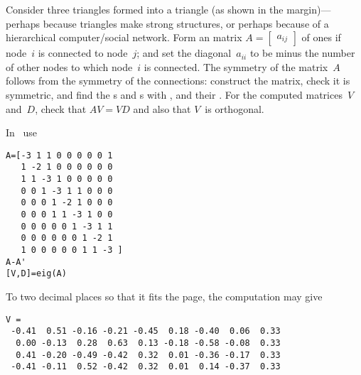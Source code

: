 \begin{example} \label{eg:sier2eig}
Consider three triangles formed into a triangle (as shown in the margin)---perhaps because triangles make strong structures, or perhaps because of a hierarchical computer\slash social network.
%
Form an matrix \(A=\begin{bmatrix} a_{ij} \end{bmatrix}\) of ones if node~\(i\) is connected to node~\(j\); and set the diagonal~\(a_{ii}\) to be minus the number of other nodes to which node~\(i\) is connected.
The symmetry of the matrix~\(A\) follows from the symmetry of the connections: construct the matrix, check it is symmetric, and find the s and s with \script, and their .
For the computed matrices~\(V\) and~\(D\), check that \(AV=VD\) and also that \(V\)~is orthogonal.
\begin{solution} In \script\ use
\setbox\ajrqrbox\hbox{}%
\marginpar{\usebox{\ajrqrbox}}%
\begin{verbatim}
A=[-3 1 1 0 0 0 0 0 1
   1 -2 1 0 0 0 0 0 0
   1 1 -3 1 0 0 0 0 0
   0 0 1 -3 1 1 0 0 0
   0 0 0 1 -2 1 0 0 0
   0 0 0 1 1 -3 1 0 0
   0 0 0 0 0 1 -3 1 1
   0 0 0 0 0 0 1 -2 1
   1 0 0 0 0 0 1 1 -3 ]
A-A'
[V,D]=eig(A)
\end{verbatim}
To two decimal places so that it fits the page, the computation may give
{\small%
\begin{verbatim}
V =
 -0.41  0.51 -0.16 -0.21 -0.45  0.18 -0.40  0.06  0.33
  0.00 -0.13  0.28  0.63  0.13 -0.18 -0.58 -0.08  0.33
  0.41 -0.20 -0.49 -0.42  0.32  0.01 -0.36 -0.17  0.33
 -0.41 -0.11  0.52 -0.42  0.32  0.01  0.14 -0.37  0.33

\end{verbatim}}
\end{solution}
\end{example}
